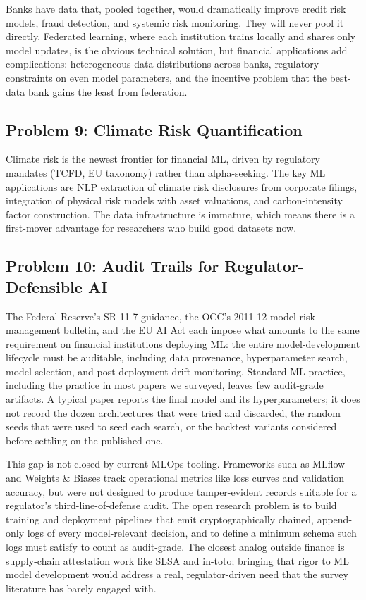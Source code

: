 Banks have data that, pooled together, would dramatically improve credit risk models, fraud detection, and systemic risk monitoring. They will never pool it directly. Federated learning, where each institution trains locally and shares only model updates, is the obvious technical solution, but financial applications add complications: heterogeneous data distributions across banks, regulatory constraints on even model parameters, and the incentive problem that the best-data bank gains the least from federation.

\subsection{Problem 9: Climate Risk Quantification}

Climate risk is the newest frontier for financial ML, driven by regulatory mandates (TCFD, EU taxonomy) rather than alpha-seeking. The key ML applications are NLP extraction of climate risk disclosures from corporate filings, integration of physical risk models with asset valuations, and carbon-intensity factor construction. The data infrastructure is immature, which means there is a first-mover advantage for researchers who build good datasets now.

\subsection{Problem 10: Audit Trails for Regulator-Defensible AI}

The Federal Reserve's SR 11-7 guidance, the OCC's 2011-12 model risk management bulletin, and the EU AI Act each impose what amounts to the same requirement on financial institutions deploying ML: the entire model-development lifecycle must be auditable, including data provenance, hyperparameter search, model selection, and post-deployment drift monitoring. Standard ML practice, including the practice in most papers we surveyed, leaves few audit-grade artifacts. A typical paper reports the final model and its hyperparameters; it does not record the dozen architectures that were tried and discarded, the random seeds that were used to seed each search, or the backtest variants considered before settling on the published one.

This gap is not closed by current MLOps tooling. Frameworks such as MLflow and Weights \& Biases track operational metrics like loss curves and validation accuracy, but were not designed to produce tamper-evident records suitable for a regulator's third-line-of-defense audit. The open research problem is to build training and deployment pipelines that emit cryptographically chained, append-only logs of every model-relevant decision, and to define a minimum schema such logs must satisfy to count as audit-grade. The closest analog outside finance is supply-chain attestation work like SLSA and in-toto; bringing that rigor to ML model development would address a real, regulator-driven need that the survey literature has barely engaged with.
